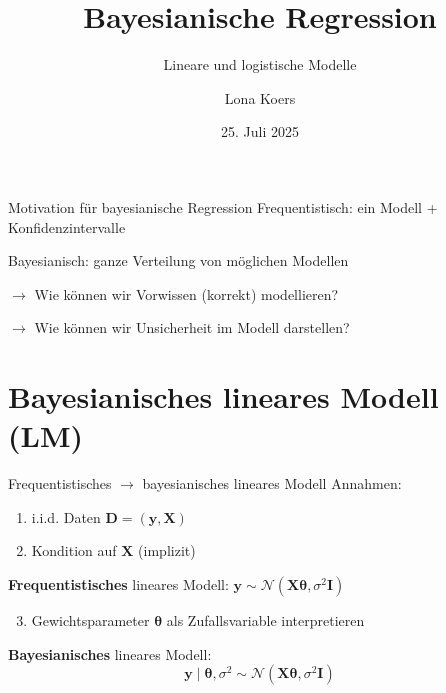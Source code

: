 \documentclass[
  ignorenonframetext,
  aspectratio=169,
]{beamer}
\title{Bayesianische Regression}
\subtitle{Lineare und logistische Modelle}
\author{Lona Koers}
\date{25. Juli 2025}
\institute{LMU}
\providecommand{\tightlist}{%
  \setlength{\itemsep}{0pt}\setlength{\parskip}{0pt}}
\newcommand{\by}{\bm{y}}
\newcommand{\bD}{\bm{D}}
\newcommand{\bI}{\bm{I}}
\newcommand{\bX}{\bm{X}}
\newcommand{\Ncal}{\mathcal{N}}
\newcommand{\ssd}{\sigma^2}
\newcommand{\btheta}{\bm{\theta}}
\begin{document}
\frame{\titlepage}

\begin{frame}{Motivation für bayesianische Regression}
\protect{}\label{motivation-fuxfcr-bayesianische-regression}
Frequentistisch: ein Modell + Konfidenzintervalle

Bayesianisch: ganze Verteilung von möglichen Modellen

\(\to\) Wie können wir Vorwissen (korrekt) modellieren?

\(\to\) Wie können wir Unsicherheit im Modell darstellen?
\end{frame}

\section{\texorpdfstring{Bayesianisches \textbf{lineares} Modell
(LM)}{Bayesianisches lineares Modell (LM)}}\label{bayesianisches-lineares-modell-lm}

\begin{frame}{Frequentistisches \(\to\) bayesianisches lineares Modell}
\protect{}\label{frequentistisches-to-bayesianisches-lineares-modell}
Annahmen:

\begin{enumerate}
\tightlist
\item
  i.i.d. Daten \(\bD = (\by, \bX)\)
\item
  Kondition auf \(\bX\) (implizit)
\end{enumerate}

\textbf{Frequentistisches} lineares Modell:
\(\by \sim \Ncal(\bX \btheta, \ssd \bI)\)

\begin{enumerate}
\setcounter{enumi}{2}
\tightlist
\item
  Gewichtsparameter \(\btheta\) als Zufallsvariable interpretieren
\end{enumerate}

\begin{block}{\textbf{Bayesianisches} lineares Modell:}
\protect{}\label{bayesianisches-lineares-modell}
\[\by \mid \btheta, \ssd \sim \Ncal(\bX \btheta, \ssd \bI)\]
\end{block}
\end{frame}
\end{document}
